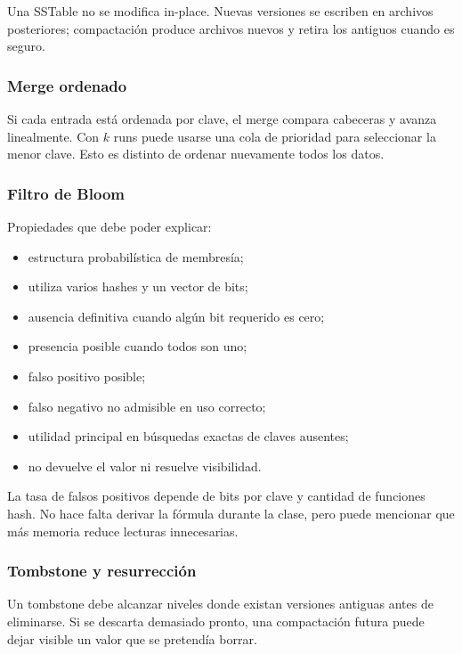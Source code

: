 \documentclass[variant=docente,cover=institutional,mode=screen]{ua-engineering-v6-article}
\begin{document}
Una SSTable no se modifica in-place. Nuevas versiones se escriben en archivos posteriores; compactación produce archivos nuevos y retira los antiguos cuando es seguro.

\subsubsection*{Merge ordenado}

Si cada entrada está ordenada por clave, el merge compara cabeceras y avanza linealmente. Con $k$ runs puede usarse una cola de prioridad para seleccionar la menor clave. Esto es distinto de ordenar nuevamente todos los datos.

\subsubsection*{Filtro de Bloom}

Propiedades que debe poder explicar:

\begin{itemize}
\item estructura probabilística de membresía;
\item utiliza varios hashes y un vector de bits;
\item ausencia definitiva cuando algún bit requerido es cero;
\item presencia posible cuando todos son uno;
\item falso positivo posible;
\item falso negativo no admisible en uso correcto;
\item utilidad principal en búsquedas exactas de claves ausentes;
\item no devuelve el valor ni resuelve visibilidad.
\end{itemize}

La tasa de falsos positivos depende de bits por clave y cantidad de funciones hash. No hace falta derivar la fórmula durante la clase, pero puede mencionar que más memoria reduce lecturas innecesarias.

\subsubsection*{Tombstone y resurrección}

Un tombstone debe alcanzar niveles donde existan versiones antiguas antes de eliminarse. Si se descarta demasiado pronto, una compactación futura puede dejar visible un valor que se pretendía borrar.
\end{document}
